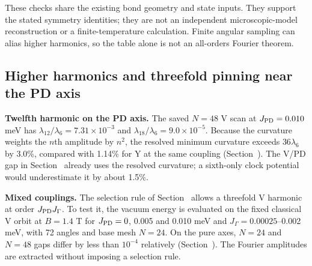 These checks share the existing bond geometry and state inputs. They
support the stated symmetry identities; they are not an independent
microscopic-model reconstruction or a finite-temperature calculation.
Finite angular sampling can alias higher harmonics, so the table alone
is not an all-orders Fourier theorem.

\subsection{Higher harmonics and threefold pinning near the PD
axis}\label{sec-nbcp-v-mixed-soc}

\textbf{Twelfth harmonic on the PD axis.} The saved \(N=48\) V scan at
\(J_{\rm PD}=0.010\) meV has \(\lambda_{12}/\lambda_6=7.31\times10^{-3}\)
and \(\lambda_{18}/\lambda_6=9.0\times10^{-5}\). Because the curvature
weights the \(n\)th amplitude by \(n^2\), the resolved minimum curvature
exceeds \(36\lambda_6\) by 3.0\%, compared with 1.14\% for Y at the same
coupling (Section~). The V/PD gap in
Section~ already uses the resolved curvature; a
sixth-only clock potential would underestimate it by about 1.5\%.

\textbf{Mixed couplings.} The selection rule of
Section~ allows a threefold V harmonic at
order \(J_{\rm PD}J_\Gamma\). To test it, the vacuum energy is evaluated on
the fixed classical V orbit at \(B=1.4\) T for \(J_{\rm PD}=0\), 0.005 and
0.010 meV and \(J_\Gamma=0.00025\)--0.002 meV, with 72 angles and base
mesh \(N=24\). On the pure axes, \(N=24\) and \(N=48\) gaps differ by less
than \(10^{-4}\) relatively (Section~). The Fourier
amplitudes are extracted without imposing a selection rule.

